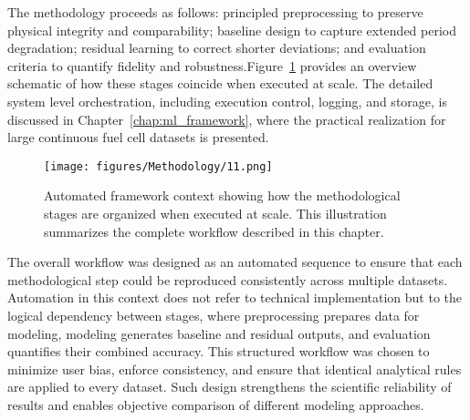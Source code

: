 The methodology proceeds as follows: principled preprocessing to preserve physical integrity and comparability; baseline design to capture extended period degradation; residual learning to correct shorter deviations; and evaluation criteria to quantify fidelity and robustness.Figure~\ref{fig:automated_framework} provides an overview schematic of how these stages coincide when executed at scale. The detailed system level orchestration, including execution control, logging, and storage, is discussed in Chapter~\ref{chap:ml_framework}, where the practical realization for large continuous fuel cell datasets is presented.
\begin{figure}[H]
\centering
 \texttt{[image: figures/Methodology/11.png]}
 \caption[Automated framework context for applying the methodology]{Automated framework context showing how the methodological stages are organized when executed at scale. This illustration summarizes the complete workflow described in this chapter.}
 \label{fig:automated_framework}
\end{figure}
The overall workflow was designed as an automated sequence to ensure that each methodological step could be reproduced consistently across multiple datasets. Automation in this context does not refer to technical implementation but to the logical dependency between stages, where preprocessing prepares data for modeling, modeling generates baseline and residual outputs, and evaluation quantifies their combined accuracy. This structured workflow was chosen to minimize user bias, enforce consistency, and ensure that identical analytical rules are applied to every dataset. Such design strengthens the scientific reliability of results and enables objective comparison of different modeling approaches.

